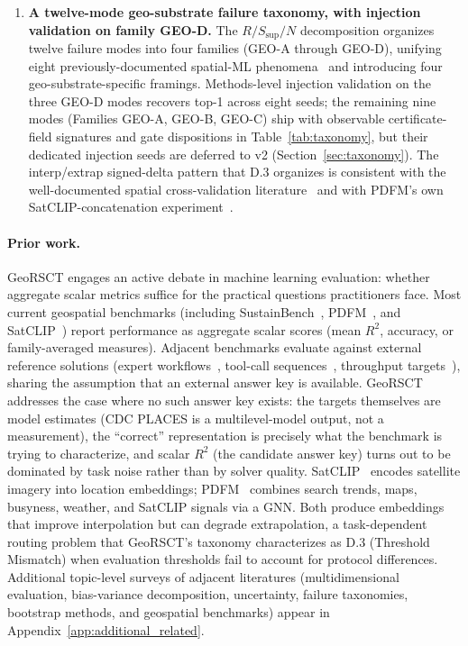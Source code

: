 \documentclass{article}
\begin{document}
\begin{enumerate}
\item \textbf{A twelve-mode geo-substrate failure taxonomy, with injection validation on family GEO-D.} The $R/S_{\text{sup}}/N$ decomposition organizes twelve failure modes into four families (GEO-A through GEO-D), unifying eight previously-documented spatial-ML phenomena~\citep{roberts2017cv,ploton2020spatial,brunsdon1996gwr,openshaw1984maup,workman2022resolution,krieger2002zip,chen2025crosswalk,oliver2005cartographic,cao2017projection,kwon2023acs} and introducing four geo-substrate-specific framings. Methods-level injection validation on the three GEO-D modes recovers top-1 across eight seeds; the remaining nine modes (Families GEO-A, GEO-B, GEO-C) ship with observable certificate-field signatures and gate dispositions in Table~\ref{tab:taxonomy}, but their dedicated injection seeds are deferred to v2 (Section~\ref{sec:taxonomy}). The interp/extrap signed-delta pattern that D.3 organizes is consistent with the well-documented spatial cross-validation literature~\citep{roberts2017cv,ploton2020spatial,mila2022nndm} and with PDFM's own SatCLIP-concatenation experiment~\citep[Table~4]{agarwal2025pdfm}.
\end{enumerate}

\paragraph{Prior work.}
\label{sec:related}
GeoRSCT engages an active debate in machine learning evaluation: whether aggregate scalar metrics suffice for the practical questions practitioners face. Most current geospatial benchmarks (including SustainBench~\citep{yeh2021sustainbench}, PDFM~\citep{agarwal2025pdfm}, and SatCLIP~\citep{klemmer2023satclip}) report performance as aggregate scalar scores (mean $R^2$, accuracy, or family-averaged measures). Adjacent benchmarks evaluate against external reference solutions (expert workflows~\citep{zhang2025geoanalyst}, tool-call sequences~\citep{krechetova2025geobenchx}, throughput targets~\citep{kim2023geoycsb}), sharing the assumption that an external answer key is available. GeoRSCT addresses the case where no such answer key exists: the targets themselves are model estimates (CDC PLACES is a multilevel-model output, not a measurement), the ``correct'' representation is precisely what the benchmark is trying to characterize, and scalar $R^2$ (the candidate answer key) turns out to be dominated by task noise rather than by solver quality. SatCLIP~\citep{klemmer2023satclip} encodes satellite imagery into location embeddings; PDFM~\citep{agarwal2025pdfm} combines search trends, maps, busyness, weather, and SatCLIP signals via a GNN. Both produce embeddings that improve interpolation but can degrade extrapolation, a task-dependent routing problem that GeoRSCT's taxonomy characterizes as D.3 (Threshold Mismatch) when evaluation thresholds fail to account for protocol differences. Additional topic-level surveys of adjacent literatures (multidimensional evaluation, bias-variance decomposition, uncertainty, failure taxonomies, bootstrap methods, and geospatial benchmarks) appear in Appendix~\ref{app:additional_related}.
\end{document}
